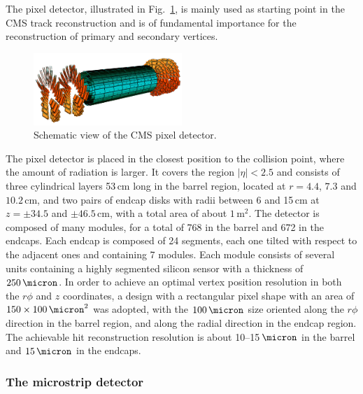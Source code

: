The pixel detector, illustrated in Fig.~\ref{fig:pixel}, is mainly used as starting point in the CMS track reconstruction and is of fundamental importance for the reconstruction of primary and secondary vertices. 
\begin{figure}[htb]
\centering
\includegraphics[width=0.5\textwidth]{images/pixel.png}
\caption{Schematic view of the CMS pixel detector.}\label{fig:pixel}
\end{figure}
The pixel detector is placed in the closest position to the collision point, where the amount of radiation is larger. It covers the region $|\eta|<2.5$ and consists of three cylindrical layers 53\,cm long in the barrel region, located at $r=4.4$, $7.3$ and $10.2$\,cm, and two pairs of endcap disks with radii between 6 and 15\,cm at $z=\pm34.5$ and $\pm46.5$\,cm, with a total area of about $1\,\mathrm{m^2}$. The detector is composed of many modules, for a total of 768 in the barrel and 672 in the endcaps. Each endcap is composed of 24 segments, each one tilted with respect to the adjacent ones and containing 7 modules. Each module consists of several units containing a highly segmented silicon sensor with a thickness of $250\,\micron$. In order to achieve an optimal vertex position resolution in both the $r\phi$ and $z$ coordinates, a design with a rectangular pixel shape with an area of $150\times100\,\micron^2$ was adopted, with the $100\,\micron$ size oriented along the $r\phi$ direction in the barrel region, and along the radial direction in the endcap region. The achievable hit reconstruction resolution is about 10--15$\,\micron$ in the barrel and $15\,\micron$ in the endcaps.

\subsubsection{The microstrip detector}

